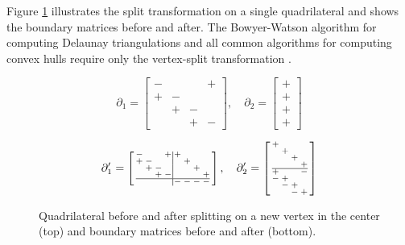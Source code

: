 \documentclass[twocolumn]{article}
\makeatletter
\newenvironment{smallarray}[1]
 {\null\,\vcenter\bgroup\scriptsize
  \renewcommand{\arraystretch}{0.7}%
  \arraycolsep=.13885em
  \hbox\bgroup$\array{@{}#1@{}}}
 {\endarray$\egroup\egroup\,\null}
\makeatother
\begin{document}
Figure \ref{fig:split-transformation} illustrates the split transformation on a single quadrilateral and shows the boundary matrices before and after.
The Bowyer-Watson algorithm for computing Delaunay triangulations and all common algorithms for computing convex hulls require only the vertex-split transformation \cite{cheng2013delaunay}.

\begin{figure}[t]
    \begin{center}
        
    \end{center}

    \begin{equation*}
        \partial_1 = \left[\begin{smallmatrix}
            - &   &   & + \\
            + & - &   &   \\
              & + & - &   \\
              &   & + & -
        \end{smallmatrix}\right],
        \quad
        \partial_2 = \left[\begin{smallmatrix}
            + \\ + \\ + \\ +
        \end{smallmatrix}\right]
    \end{equation*}

    \begin{equation*}
        \partial_1' = \left[\begin{smallarray}{cccc|cccc}
            - &   &   & + & + &   &   &   \\
            + & - &   &   &   & + &   &   \\
              & + & - &   &   &   & + &   \\
              &   & + & - &   &   &   & + \\
            \hline
              &   &   &   & - & - & - & -
        \end{smallarray}\right], \quad
        \partial_2' = \left[\begin{smallarray}{cccc}
            + &   &   &   \\
              & + &   &   \\
              &   & + &   \\
              &   &   & + \\
            \hline
            + &   &   & - \\
            - & + &   &   \\
              & - & + &   \\
              &   & - & +
        \end{smallarray}\right]
    \end{equation*}

    \caption{Quadrilateral before and after splitting on a new vertex in the center (top) and boundary matrices before and after (bottom).}
    \label{fig:split-transformation}
\end{figure}
\end{document}
